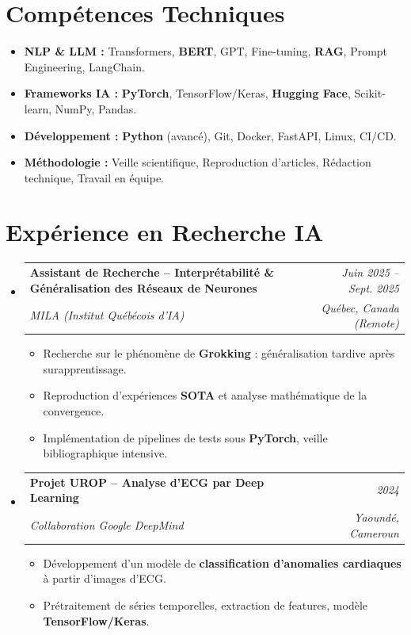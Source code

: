 \documentclass[a4paper,11pt]{article}
\makeatletter
\newcommand{\resumeSubheading}[4]{
  \vspace{-1pt}\item
    \begin{tabular*}{0.97\textwidth}[t]{l@{\extracolsep{\fill}}r}
      \textbf{#1} & \textit{\small #2} \\
      \textit{\small #3} & \textit{\small #4} \\
    \end{tabular*}\vspace{-5pt}
}
\makeatother
\begin{document}
\section{Compétences Techniques}
\begin{itemize}[leftmargin=*, nosep]
    \item \small{\textbf{NLP \& LLM :} Transformers, \textbf{BERT}, GPT, Fine-tuning, \textbf{RAG}, Prompt Engineering, LangChain.}
    \item \small{\textbf{Frameworks IA :} \textbf{PyTorch}, TensorFlow/Keras, \textbf{Hugging Face}, Scikit-learn, NumPy, Pandas.}
    \item \small{\textbf{Développement :} \textbf{Python} (avancé), Git, Docker, FastAPI, Linux, CI/CD.}
    \item \small{\textbf{Méthodologie :} Veille scientifique, Reproduction d'articles, Rédaction technique, Travail en équipe.}
\end{itemize}

\section{Expérience en Recherche IA}
\begin{itemize}[leftmargin=*, label={-}]

    \resumeSubheading
      {Assistant de Recherche -- Interprétabilité \& Généralisation des Réseaux de Neurones}{Juin 2025 -- Sept. 2025}
      {MILA (Institut Québécois d'IA)}{Québec, Canada (Remote)}
      \begin{itemize}[leftmargin=0.4cm, nosep, label=\tiny$\bullet$]
        \item \small{Recherche sur le phénomène de \textbf{Grokking} : généralisation tardive après surapprentissage.}
        \item \small{Reproduction d'expériences \textbf{SOTA} et analyse mathématique de la convergence.}
        \item \small{Implémentation de pipelines de tests sous \textbf{PyTorch}, veille bibliographique intensive.}
      \end{itemize}
    \vspace{2pt}

    \resumeSubheading
      {Projet UROP -- Analyse d'ECG par Deep Learning}{2024}
      {Collaboration Google DeepMind}{Yaoundé, Cameroun}
      \begin{itemize}[leftmargin=0.4cm, nosep, label=\tiny$\bullet$]
        \item \small{Développement d'un modèle de \textbf{classification d'anomalies cardiaques} à partir d'images d'ECG.}
        \item \small{Prétraitement de séries temporelles, extraction de features, modèle \textbf{TensorFlow/Keras}.}
      \end{itemize}

\end{itemize}
\end{document}
